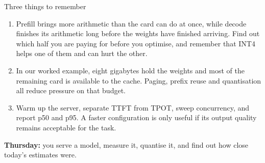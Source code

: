 \documentclass[aspectratio=169,10pt]{beamer}
\begin{document}
\begin{frame}{Three things to remember}
  \begin{enumerate}
    \item {} Prefill
      brings more arithmetic than the card can do at once, while decode
      finishes its arithmetic long before the weights have finished arriving.
      Find out which half you are paying for before you optimise, and
      remember that INT4 helps one of them and can hurt the other.
      \vspace{0.6em}
    \item {}
      In our worked example, eight gigabytes hold the weights and most of the
      remaining card is available to the cache. Paging, prefix reuse and
      quantisation all reduce pressure on that budget.
      \vspace{0.6em}
    \item {}
      Warm up the server, separate TTFT from TPOT, sweep concurrency, and
      report p50 and p95. A faster configuration is only useful if its output
      quality remains acceptable for the task.
  \end{enumerate}
  \vfill
  \textbf{Thursday:} you serve a model, measure it, quantise it, and
  find out how close today's estimates were.
\end{frame}
\end{document}
